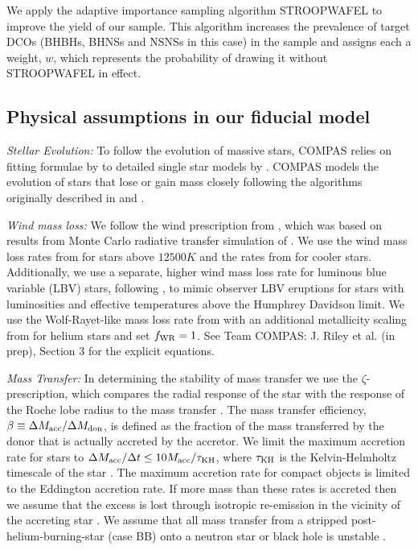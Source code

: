 We apply the adaptive importance sampling algorithm STROOPWAFEL \citep{Broekgaarden+2019} to improve the yield of our sample. This algorithm increases the prevalence of target DCOs (BHBHs, BHNSs and NSNSs in this case) in the sample and assigns each a weight, $w$, which represents the probability of drawing it without STROOPWAFEL in effect.

\subsection{Physical assumptions in our fiducial model}\label{sec:fiducial_physics}

\textit{Stellar Evolution:} To follow the evolution of massive stars, COMPAS relies on fitting formulae by \citet{Hurley+2000} to detailed single star models by \citet{Pols+1998}. COMPAS models the evolution of stars that lose or gain mass closely following the algorithms originally described in \citet{Tout+1996} and \citet{Hurley+2002}.

\textit{Wind mass loss:} We follow the wind prescription from \citet{Belczynski+2008}, which was based on results from Monte Carlo radiative transfer simulation of \citet{Vink+2000, Vink+2001}. We use the wind mass loss rates from \citet{Vink+2001} for stars above $12500 \unit{K}$ and the rates from \citet{Hurley+2000} for cooler stars. Additionally, we use a separate, higher wind mass loss rate for luminous blue variable (LBV) stars, following \citet{Belczynski+2008}, to mimic observer LBV eruptions for stars with luminosities and  effective temperatures above the Humphrey Davidson limit. We use the Wolf-Rayet-like mass loss rate from \citet{Hamann+1998} with an additional metallicity scaling from \citet{Vink+2005} for helium stars and set $f_{\rm WR} = 1$. See Team COMPAS: J. Riley et al. (in prep), Section 3 for the explicit equations.

\textit{Mass Transfer:} In determining the stability of mass transfer we use the $\zeta$-prescription, which compares the radial response of the star with the response of the Roche lobe radius to the mass transfer \citep[e.g.][]{Hjellming+1987}. The mass transfer efficiency, $\beta \equiv \Delta M_{\rm acc} / \Delta M_{\rm don}$, is defined as the fraction of the mass transferred by the donor that is actually accreted by the accretor. We limit the maximum accretion rate for stars to $\Delta M_{\rm acc} / \Delta t \le 10 M_{\rm acc} / \tau_{\rm KH}$, where $\tau_{\rm KH}$ is the Kelvin-Helmholtz timescale of the star \citep{Paczynski+1972, Hurley+2002}. The maximum accretion rate for compact objects is limited to the Eddington accretion rate. If more mass than these rates is accreted then we assume that the excess is lost through isotropic re-emission in the vicinity of the accreting star \citep[e.g.][]{Massevitch+1975, Soberman+1997}. We assume that all mass transfer from a stripped post-helium-burning-star (case BB) onto a neutron star or black hole is unstable \citep{Tauris+2015}.

